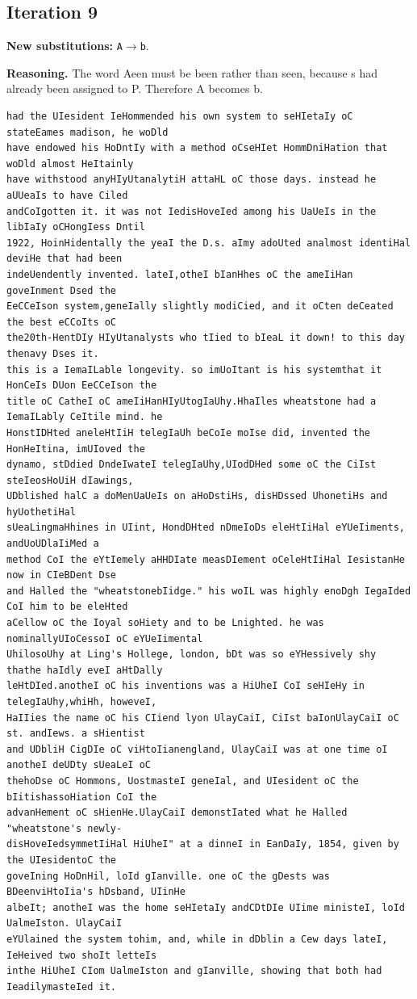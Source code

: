 \documentclass[12pt,a4paper]{article}
\begin{document}
\subsection{Iteration 9}

\noindent\textbf{New substitutions:} \texttt{A}$\rightarrow$\texttt{b}.\par
\smallskip
\noindent\textbf{Reasoning.} The word Aeen must be been rather than seen, because s had already been assigned to P. Therefore A becomes b.

\begin{lstlisting}[style=ciphertext,caption={Complete text after iteration 9}]
had the UIesident IeHommended his own system to seHIetaIy oC stateEames madison, he woDld
have endowed his HoDntIy with a method oCseHIet HommDniHation that woDld almost HeItainly
have withstood anyHIyUtanalytiH attaHL oC those days. instead he aUUeaIs to have Ciled
andCoIgotten it. it was not IedisHoveIed among his UaUeIs in the libIaIy oCHongIess Dntil
1922, HoinHidentally the yeaI the D.s. aImy adoUted analmost identiHal deviHe that had been
indeUendently invented. lateI,otheI bIanHhes oC the ameIiHan goveInment Dsed the
EeCCeIson system,geneIally slightly modiCied, and it oCten deCeated the best eCCoIts oC
the20th-HentDIy HIyUtanalysts who tIied to bIeaL it down! to this day thenavy Dses it.
this is a IemaILable longevity. so imUoItant is his systemthat it HonCeIs DUon EeCCeIson the
title oC CatheI oC ameIiHanHIyUtogIaUhy.HhaIles wheatstone had a IemaILably CeItile mind. he
HonstIDHted aneleHtIiH telegIaUh beCoIe moIse did, invented the HonHeItina, imUIoved the
dynamo, stDdied DndeIwateI telegIaUhy,UIodDHed some oC the CiIst steIeosHoUiH dIawings,
UDblished halC a doMenUaUeIs on aHoDstiHs, disHDssed UhonetiHs and hyUothetiHal
sUeaLingmaHhines in UIint, HondDHted nDmeIoDs eleHtIiHal eYUeIiments, andUoUDlaIiMed a
method CoI the eYtIemely aHHDIate measDIement oCeleHtIiHal IesistanHe now in CIeBDent Dse
and Halled the "wheatstonebIidge." his woIL was highly enoDgh IegaIded CoI him to be eleHted
aCellow oC the Ioyal soHiety and to be Lnighted. he was nominallyUIoCessoI oC eYUeIimental
UhilosoUhy at Ling's Hollege, london, bDt was so eYHessively shy thathe haIdly eveI aHtDally
leHtDIed.anotheI oC his inventions was a HiUheI CoI seHIeHy in telegIaUhy,whiHh, howeveI,
HaIIies the name oC his CIiend lyon UlayCaiI, CiIst baIonUlayCaiI oC st. andIews. a sHientist
and UDbliH CigDIe oC viHtoIianengland, UlayCaiI was at one time oI anotheI deUDty sUeaLeI oC
thehoDse oC Hommons, UostmasteI geneIal, and UIesident oC the bIitishassoHiation CoI the
advanHement oC sHienHe.UlayCaiI demonstIated what he Halled "wheatstone's newly-
disHoveIedsymmetIiHal HiUheI" at a dinneI in EanDaIy, 1854, given by the UIesidentoC the
goveIning HoDnHil, loId gIanville. one oC the gDests was BDeenviHtoIia's hDsband, UIinHe
albeIt; anotheI was the home seHIetaIy andCDtDIe UIime ministeI, loId UalmeIston. UlayCaiI
eYUlained the system tohim, and, while in dDblin a Cew days lateI, IeHeived two shoIt letteIs
inthe HiUheI CIom UalmeIston and gIanville, showing that both had IeadilymasteIed it.
\end{lstlisting}
\end{document}
